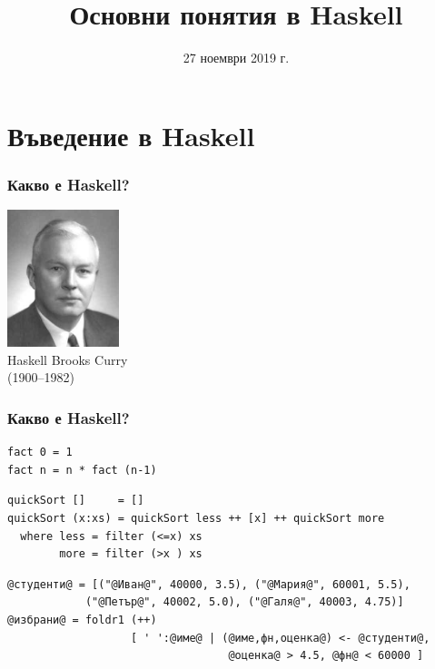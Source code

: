 \documentclass[alsotrans]{beamerswitch}
\title{Основни понятия в Haskell}
\date{27 ноември 2019 г.}
\begin{document}
\begin{frame}
  \titlepage
\end{frame}

\section{Въведение в Haskell}

\begin{frame}
  \frametitle{Какво е Haskell?}

  \pause
  \begin{center}
    \includegraphics[height=4cm]{images/HaskellBCurry.jpg}\\
    Haskell Brooks Curry\\
    (1900--1982)\\[5ex]
  \end{center}
\end{frame}

\lstset{basicstyle=\small\ttfamily}

\begin{frame}[fragile]
  \frametitle{Какво е Haskell?}

  \pause
\begin{lstlisting}
fact 0 = 1
fact n = n * fact (n-1)
\end{lstlisting}
  \pause
\begin{lstlisting}
quickSort []     = []
quickSort (x:xs) = quickSort less ++ [x] ++ quickSort more
  where less = filter (<=x) xs
        more = filter (>x ) xs
\end{lstlisting}
  \pause
\begin{lstlisting}
@студенти@ = [("@Иван@", 40000, 3.5), ("@Мария@", 60001, 5.5),
            ("@Петър@", 40002, 5.0), ("@Галя@", 40003, 4.75)]
@избрани@ = foldr1 (++)
                   [ ' ':@име@ | (@име,фн,оценка@) <- @студенти@,
                                  @оценка@ > 4.5, @фн@ < 60000 ]
\end{lstlisting}
\end{frame}
\end{document}
